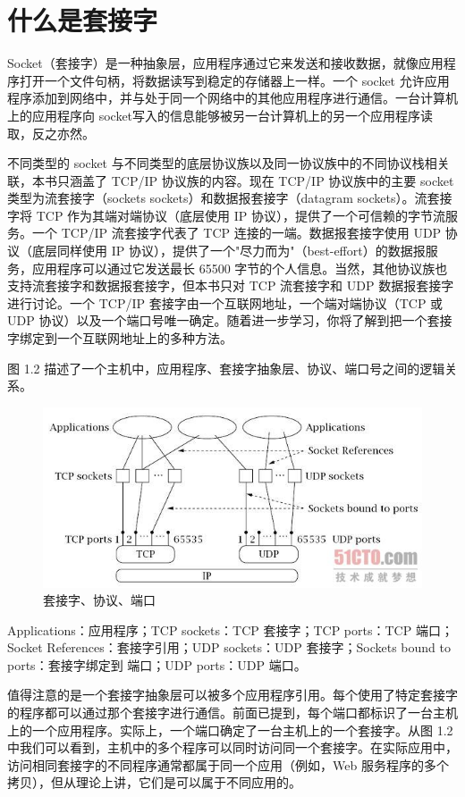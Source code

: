 	\section{什么是套接字}

		Socket（套接字）是一种抽象层，应用程序通过它来发送和接收数据，就像应用程序打开一个文件句柄，将数据读写到稳定的存储器上一样。一个 socket 允许应用程序添加到网络中，并与处于同一个网络中的其他应用程序进行通信。一台计算机上的应用程序向 socket写入的信息能够被另一台计算机上的另一个应用程序读取，反之亦然。

		不同类型的 socket 与不同类型的底层协议族以及同一协议族中的不同协议栈相关联，本书只涵盖了 TCP/IP 协议族的内容。现在 TCP/IP 协议族中的主要 socket 类型为流套接字（sockets sockets）和数据报套接字（datagram sockets）。流套接字将 TCP 作为其端对端协议（底层使用 IP 协议），提供了一个可信赖的字节流服务。一个 TCP/IP 流套接字代表了 TCP 连接的一端。数据报套接字使用 UDP 协议（底层同样使用 IP 协议），提供了一个"尽力而为"（best-effort）的数据报服务，应用程序可以通过它发送最长 65500 字节的个人信息。当然，其他协议族也支持流套接字和数据报套接字，但本书只对 TCP 流套接字和 UDP 数据报套接字进行讨论。一个 TCP/IP 套接字由一个互联网地址，一个端对端协议（TCP 或 UDP 协议）以及一个端口号唯一确定。随着进一步学习，你将了解到把一个套接字绑定到一个互联网地址上的多种方法。

		图 1.2 描述了一个主机中，应用程序、套接字抽象层、协议、端口号之间的逻辑关系。
		\begin{figure}[htbp]%
			\centering
			\includegraphics[scale=.6]{img/01.02.jpg}
			\caption{套接字、协议、端口}
			\label{fig:socket.trans}
		\end{figure}

		Applications：应用程序；TCP sockets：TCP 套接字；TCP ports：TCP 端口；Socket References：套接字引用；UDP sockets：UDP 套接字；Sockets bound to ports：套接字绑定到 端口；UDP ports：UDP 端口。

		值得注意的是一个套接字抽象层可以被多个应用程序引用。每个使用了特定套接字的程序都可以通过那个套接字进行通信。前面已提到，每个端口都标识了一台主机上的一个应用程序。实际上，一个端口确定了一台主机上的一个套接字。从图 1.2 中我们可以看到，主机中的多个程序可以同时访问同一个套接字。在实际应用中，访问相同套接字的不同程序通常都属于同一个应用（例如，Web 服务程序的多个拷贝），但从理论上讲，它们是可以属于不同应用的。


